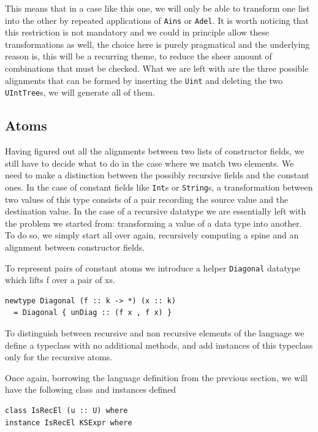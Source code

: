 \documentclass[11pt, titlepage]{article}
\begin{document}
This means that in a case like this one, we will only be able to transform 
one list into the other by repeated applications of \texttt{Ains} or 
\texttt{Adel}. It is worth noticing that this restriction is not mandatory and 
we could in principle allow these transformations as well, the choice here is purely pragmatical and the underlying reason is,
this will be a recurring theme, to reduce the sheer amount of combinations that must be checked.
What we are left with are the three possible alignments that can be formed by inserting the \texttt{Uint} and deleting the two \texttt{UIntTree}s, we will generate all of them. 

\subsection{Atoms}\label{atoms}

Having figured out all the alignments between two lists of constructor
fields, we still have to decide what to do in the case where we match two
elements. We need to make a distinction between the possibly
recursive fields and the constant ones.
In the case of constant fields
like \texttt{Int}s or \texttt{String}s, a transformation between two
values of this type consists of a pair recording the source value and the
destination value. In the case of a recursive datatype we are
essentially left with the problem we started from: transforming a value
of a data type into another. To do so, we simply start all over again,
recursively computing a spine and an alignment between constructor
fields.

To represent pairs of constant atoms we introduce a helper \texttt{Diagonal} datatype which 
lifts f over a pair of xs.

\begin{verbatim}
newtype Diagonal (f :: k -> *) (x :: k) 
  = Diagonal { unDiag :: (f x , f x) }
\end{verbatim}

To distinguish between recursive and non recursive elements of the language we 
define a typeclass with no additional methods, and add instances of this typeclass only for the recursive atoms.

Once again, borrowing the language definition from the previous section, we will have the following 
class and instances defined
\begin{verbatim}
class IsRecEl (u :: U) where
instance IsRecEl KSExpr where
\end{verbatim}
\end{document}
